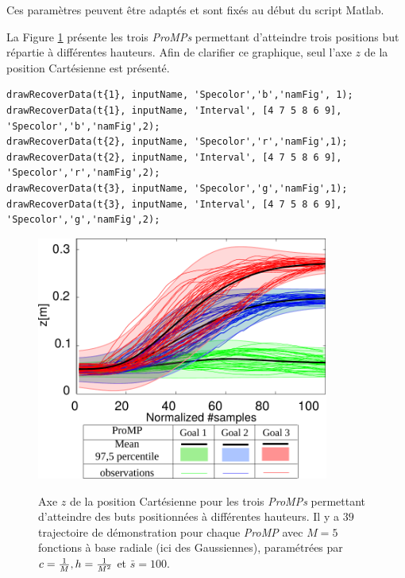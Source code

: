 \documentclass[utf8]{frontiersSCNS} %
\newcommand{\todo}[1]{\textcolor{red}{\textbf{/*#1*/}}}
\begin{document}
Ces paramètres peuvent être adaptés et sont fixés au début du script Matlab.


La Figure \ref{fig:3TargetsZTrajectoriesProMP} présente les trois \textit{ProMPs} permettant d'atteindre trois positions but répartie à différentes hauteurs. Afin de clarifier ce graphique, seul l'axe $z$ de la position Cartésienne est présenté.

\begin{lstlisting}
drawRecoverData(t{1}, inputName, 'Specolor','b','namFig', 1);
drawRecoverData(t{1}, inputName, 'Interval', [4 7 5 8 6 9], 'Specolor','b','namFig',2);
drawRecoverData(t{2}, inputName, 'Specolor','r','namFig',1);
drawRecoverData(t{2}, inputName, 'Interval', [4 7 5 8 6 9], 'Specolor','r','namFig',2);
drawRecoverData(t{3}, inputName, 'Specolor','g','namFig',1);
drawRecoverData(t{3}, inputName, 'Interval', [4 7 5 8 6 9], 'Specolor','g','namFig',2);
\end{lstlisting}


\begin{figure}[h]
\centering
{
\includegraphics[height=8cm]{img/3DOFtrajectoriesProMPs.pdf}
}
\caption{Axe $z$ de la position Cartésienne pour les trois \textit{ProMPs} permettant d'atteindre des buts positionnées à différentes hauteurs. Il y a $39$ trajectoire de démonstration pour chaque \textit{ProMP} avec $M=5$ fonctions à base radiale (ici des Gaussiennes), paramétrées par $c={1 \over M}, h={1 \over M^2}$ et $\bar{s} = 100$.}
\label{fig:3TargetsZTrajectoriesProMP}
\end{figure}
\end{document}
